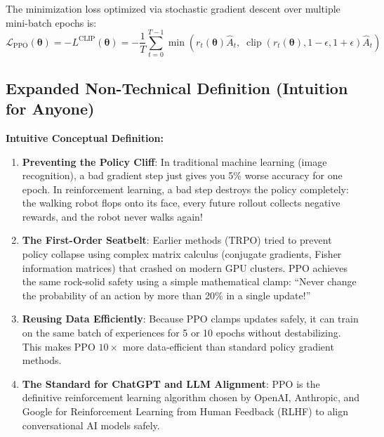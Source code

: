 \documentclass[11pt,a4paper]{article}
\theoremstyle{definition}
\begin{document}
The minimization loss optimized via stochastic gradient descent over multiple mini-batch epochs is:
{\boldmath
\begin{equation}
\mathcal{L}_{\text{PPO}}(\boldsymbol{\theta}) = - L^{\text{CLIP}}(\boldsymbol{\theta}) = - \frac{1}{T}\sum_{t=0}^{T-1} \min\left( r_t(\boldsymbol{\theta}) \widehat{A}_t, \; \operatorname{clip}(r_t(\boldsymbol{\theta}), 1 - \epsilon, 1 + \epsilon) \widehat{A}_t \right)
\end{equation}
}

\subsection{Expanded Non-Technical Definition (Intuition for Anyone)}
\textbf{Intuitive Conceptual Definition:}
\begin{enumerate}
    \item \textbf{Preventing the Policy Cliff}: In traditional machine learning (image recognition), a bad gradient step just gives you 5\% worse accuracy for one epoch. In reinforcement learning, a bad step destroys the policy completely: the walking robot flops onto its face, every future rollout collects negative rewards, and the robot never walks again!
    \item \textbf{The First-Order Seatbelt}: Earlier methods (TRPO) tried to prevent policy collapse using complex matrix calculus (conjugate gradients, Fisher information matrices) that crashed on modern GPU clusters. PPO achieves the same rock-solid safety using a simple mathematical clamp: ``Never change the probability of an action by more than 20\% in a single update!''
    \item \textbf{Reusing Data Efficiently}: Because PPO clamps updates safely, it can train on the same batch of experiences for 5 or 10 epochs without destabilizing. This makes PPO $10\times$ more data-efficient than standard policy gradient methods.
    \item \textbf{The Standard for ChatGPT and LLM Alignment}: PPO is the definitive reinforcement learning algorithm chosen by OpenAI, Anthropic, and Google for Reinforcement Learning from Human Feedback (RLHF) to align conversational AI models safely.
\end{enumerate}
\end{document}
